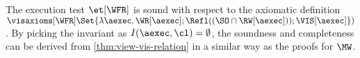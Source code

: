 The execution test \(\et[\WFR]\) is sound with respect to the axiomatic definition 
\(\visaxioms[\WFR] \Set{\lambda \aexec \ldotp \WR[\aexec] ; \Refl((\SO \cap \RW[\aexec] )) ; \VIS[\aexec] })\) 
\citep{surech-session-guarantee}.
By picking the invariant as \( I( \aexec, \cl ) = \emptyset \), the soundness and completeness
can be derived from \cref{thm:view-vis-relation} in a similar way as the proofs for \( \MW \).
